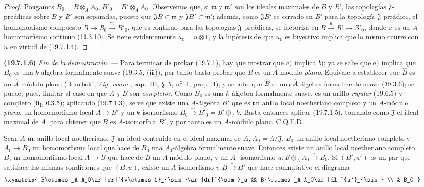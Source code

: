 \begin{proof}
Pongamos $B_0=B\otimes_A A_0$, $B'_0=B'\otimes_A A_0$. Observemos que, si
$\mathfrak m$ y $\mathfrak m'$ son los ideales maximales de $B$ y $B'$, las
topologías $\mathfrak J$-preádicas sobre $B$ y $B'$ son separadas, puesto que
$\mathfrak JB\subset\mathfrak m$ y $\mathfrak JB'\subset\mathfrak m'$; además,
como $\mathfrak JB'$ es cerrado en $B'$ para la topología
$\mathfrak J$-preádica, el homomorfismo compuesto
$B\to B_0\xrightarrow{u_0}B'_0$, que es continuo para las topologías
$\mathfrak J$-preádicas, se factoriza en $B\xrightarrow{u}B'\to B'_0$, donde
$u$ es un $A$-homomorfismo continuo (19.3.10). Se tiene evidentemente
$u_0=u\otimes1$, y la hipótesis de que $u_0$ es biyectivo implica que lo mismo
ocurre con $u$ en virtud de (19.7.1.4).
\end{proof}

\medskip
\noindent\textbf{(19.7.1.6)}\enspace
\emph{Fin de la demostración.} --- Para terminar de probar (19.7.1), hay que
mostrar que $a)$ implica $b)$; ya se sabe que $a)$ implica que $B_0$ es
una $k$-álgebra formalmente suave (19.3.5, (iii)), por tanto basta probar
que $B$ es un $A$-módulo \emph{plano}. Equivale a establecer que $\widehat B$
es un $\widehat A$-módulo plano (Bourbaki, \emph{Alg. conm.}, cap.~III, §~5,
n\textsuperscript{o}~4, prop.~4), y se sabe que $\widehat B$ es una
$\widehat A$-álgebra formalmente suave (19.3.6); se puede, pues, limitar al
caso en que $A$ y $B$ son \emph{completos}. Como $B_0$ es una $k$-álgebra formalmente
suave, es un anillo \emph{regular} (19.6.5) y completo
($\mathbf 0_{\mathrm I}$, 6.3.5); aplicando (19.7.1.3), se ve que existe
una $A$-álgebra $B'$ que es un anillo local noetheriano completo y un
$A$-módulo \emph{plano}, un homomorfismo local $A\to B'$ y un $k$-isomorfismo
$B_0\xrightarrow{\sim}B'_0=B'\otimes_A k$. Basta entonces aplicar (19.7.1.5),
tomando como $\mathfrak J$ el ideal maximal de $A$, para obtener que $B$ es
$A$-isomorfo a $B'$, y por tanto es un $A$-módulo plano. C.Q.F.D.

\begin{theorem}[19.7.2]
\label{0.19.7.2-fr}
Sean $A$ un anillo local noetheriano, $\mathfrak J$ un ideal contenido en
el ideal maximal de $A$, $A_0=A/\mathfrak J$, $B_0$ un anillo local noetheriano
completo y $A_0\to B_0$ un homomorfismo local que hace de $B_0$ una
$A_0$-álgebra formalmente suave. Entonces existe un anillo local noetheriano
completo $B$, un homomorfismo local $A\to B$ que hace de $B$ un $A$-módulo
\textup{plano}, y un $A_0$-isomorfismo
$u:B\otimes_A A_0\xrightarrow{\sim}B_0$. Si $(B',u')$ es un par
que satisface las mismas condiciones que $(B,u)$, existe un $A$-isomorfismo
$v:B\xrightarrow{\sim}B'$ que hace conmutativo el diagrama
\[
\xymatrix{
  B\otimes_A A_0\ar[rr]^{v\otimes1}_{\sim}\ar[dr]^{\sim}_u &&
  B'\otimes_A A_0\ar[dl]^{u'}_{\sim} \\
  & B_0
}
\]
\end{theorem}

